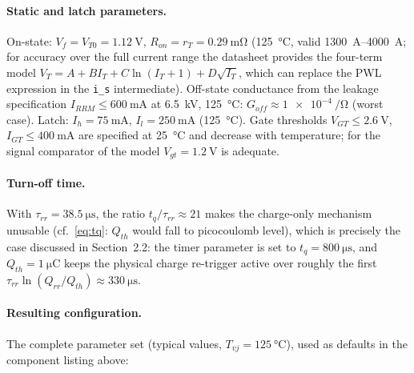 \documentclass[11pt,a4paper]{article}
\begin{document}
\paragraph{Static and latch parameters.} On-state:
$V_f = V_{T0} = \SI{1.12}{\volt}$, $R_{on} = r_T = \SI{0.29}{\milli\ohm}$
(\SI{125}{\celsius}, valid \SIrange{1300}{4000}{\ampere}; for accuracy over
the full current range the datasheet provides the four-term model
$V_T = A + B I_T + C \ln(I_T+1) + D\sqrt{I_T}$, which can replace the PWL
expression in the \texttt{i\_s} intermediate). Off-state conductance from
the leakage specification $I_{RRM} \le \SI{600}{\milli\ampere}$ at
\SI{6.5}{\kilo\volt}, \SI{125}{\celsius}:
$G_{off} \approx \SI{1e-4}{\per\ohm}$ (worst case). Latch:
$I_h = \SI{75}{\milli\ampere}$, $I_l = \SI{250}{\milli\ampere}$
(\SI{125}{\celsius}). Gate thresholds $V_{GT} \le \SI{2.6}{\volt}$,
$I_{GT} \le \SI{400}{\milli\ampere}$ are specified at \SI{25}{\celsius}
and decrease with temperature; for the signal comparator of the model
$V_{gt} = \SI{1.2}{\volt}$ is adequate.

\paragraph{Turn-off time.} With $\tau_{rr} = \SI{38.5}{\micro\second}$, the
ratio $t_q/\tau_{rr} \approx 21$ makes the charge-only mechanism unusable
(cf.\ \eqref{eq:tq}: $Q_{th}$ would fall to picocoulomb level), which is
precisely the case discussed in Section~2.2: the timer parameter is set to
$t_q = \SI{800}{\micro\second}$, and $Q_{th} = \SI{1}{\micro\coulomb}$ keeps
the physical charge re-trigger active over roughly the first
$\tau_{rr}\ln(Q_{rr}/Q_{th}) \approx \SI{330}{\micro\second}$.

\paragraph{Resulting configuration.} The complete parameter set (typical
values, $T_{vj} = \SI{125}{\celsius}$), used as defaults in the component
listing above:
\end{document}
